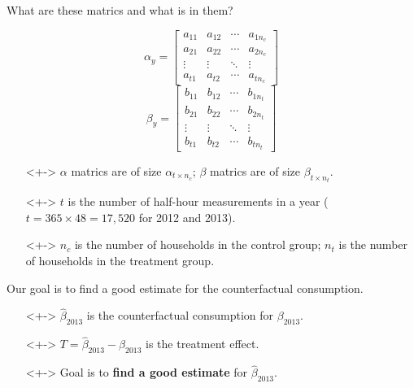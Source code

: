 \documentclass{beamer}
\begin{document}
\begin{frame}{What are these matrics and what is in them?}
  \begin{multicols}{2}
  $$
  \alpha_y = \left[\begin{array}{cccc}
  a_{11} & a_{12} & \cdots & a_{1 n_c} \\
  a_{21} & a_{22} & \cdots & a_{2 n_c} \\
  \vdots & \vdots & \ddots & \vdots \\
  a_{t 1} & a_{t 2} & \cdots & a_{t n_c}
  \end{array}\right]
  $$
  \break
  $$
  \beta_y = \left[\begin{array}{cccc}
  b_{11} & b_{12} & \cdots & b_{1 n_t} \\
  b_{21} & b_{22} & \cdots & b_{2 n_t} \\
  \vdots & \vdots & \ddots & \vdots \\
  b_{t 1} & b_{t 2} & \cdots & b_{t n_t}
  \end{array}\right]
  $$
  \end{multicols}
  \begin{itemize}
  \item[]<+-> $\alpha$ matrics are of size $\alpha_{t \times n_c}$; $\beta$ matrics are of size $\beta_{t \times n_t}$.
  \item[]<+-> $t$ is the number of half-hour measurements in a year ($t = 365 \times 48 = 17,520$ for 2012 and 2013).
  \item[]<+-> $n_c$ is the number of households in the control group; $n_t$ is the number of households in the treatment group. 
  \end{itemize}
\end{frame}

\begin{frame}{Our goal is to find a good estimate for the counterfactual consumption.}
  \begin{itemize}
    \item[]<+-> $\hat\beta_{2013}$ is the counterfactual consumption for $\beta_{2013}$.
    \item[]<+-> $T = \hat\beta_{2013} - \beta_{2013}$ is the treatment effect.
    \item[]<+-> Goal is to \textbf{find a good estimate} for $\hat\beta_{2013}$.
  \end{itemize}
\end{frame}
\end{document}
